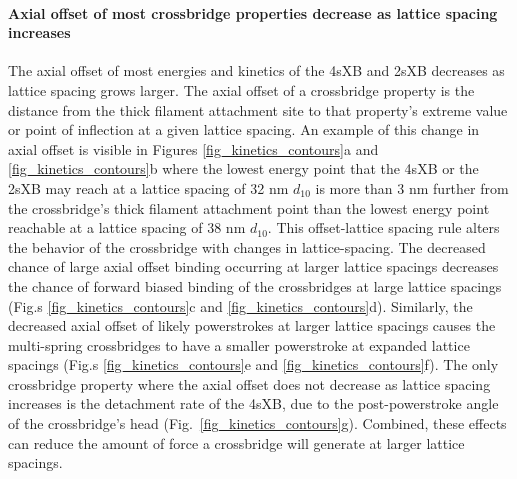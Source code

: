 \documentclass[]{article}
\begin{document}
\paragraph{Axial offset of most crossbridge properties decrease as lattice spacing increases} %
The axial offset of most energies and kinetics of the 4sXB and 2sXB decreases as lattice spacing grows larger.
The axial offset of a crossbridge property is the distance from the thick filament attachment site to that property's extreme value or point of inflection at a given lattice spacing. 
An example of this change in axial offset is visible in Figures \ref{fig_kinetics_contours}a and \ref{fig_kinetics_contours}b where the lowest energy point that the 4sXB or the 2sXB may reach at a lattice spacing of 32 nm $d_{10}$ is more than 3 nm further from the crossbridge's thick filament attachment point than the lowest energy point reachable at a lattice spacing of 38 nm $d_{10}$.
This offset-lattice spacing rule alters the behavior of the crossbridge with changes in lattice-spacing.
The decreased chance of large axial offset binding occurring at larger lattice spacings decreases the chance of forward biased binding of the crossbridges at large lattice spacings (Fig.s \ref{fig_kinetics_contours}c and \ref{fig_kinetics_contours}d).
Similarly, the decreased axial offset of likely powerstrokes at larger lattice spacings causes the multi-spring crossbridges to have a smaller powerstroke at expanded lattice spacings (Fig.s \ref{fig_kinetics_contours}e and \ref{fig_kinetics_contours}f).
The only crossbridge property where the axial offset does not decrease as lattice spacing increases is the detachment rate of the 4sXB, due to the post-powerstroke angle of the crossbridge's head (Fig.\ \ref{fig_kinetics_contours}g).
Combined, these effects can reduce the amount of force a crossbridge will generate at larger lattice spacings.
\end{document}
